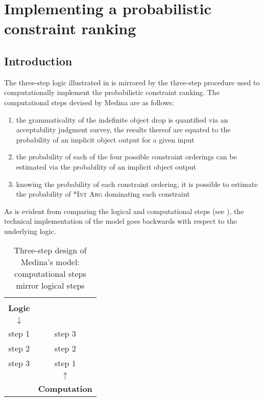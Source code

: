\section{Implementing a probabilistic constraint ranking} 

\subsection{Introduction} The three-step logic illustrated in  is mirrored by the three-step procedure used to computationally implement the probabilistic constraint ranking. The computational steps devised by Medina are as follows: 

\begin{enumerate}
    \item the grammaticality of the indefinite object drop is quantified via an acceptability judgment survey, the results thereof are equated to the probability of an implicit object output for a given input
    \item the probability of each of the four possible constraint orderings can be estimated via the probability of an implicit object output
    \item knowing the probability of each constraint ordering, it is possible to estimate the probability of \textsc{*Int Arg} dominating each constraint
\end{enumerate}

As is evident from comparing the logical and computational steps (see ), the technical implementation of the model goes backwards with respect to the underlying logic.

\begin{table}[htb] %
\caption{Three-step design of Medina's model: computational steps mirror logical steps}
\begin{tabular}{c c}
 & \\
\cmidrule{1-1} %
\textbf{Logic} &                      \\
\textbf{$\downarrow$} &                      \\ \hline
step 1         & step 3               \\
step 2         & step 2               \\
step 3         & step 1               \\ \hline
               & \textbf{$\uparrow$} \\
               & \textbf{Computation} \\
\cmidrule{2-2}           
\end{tabular}
\end{table}

